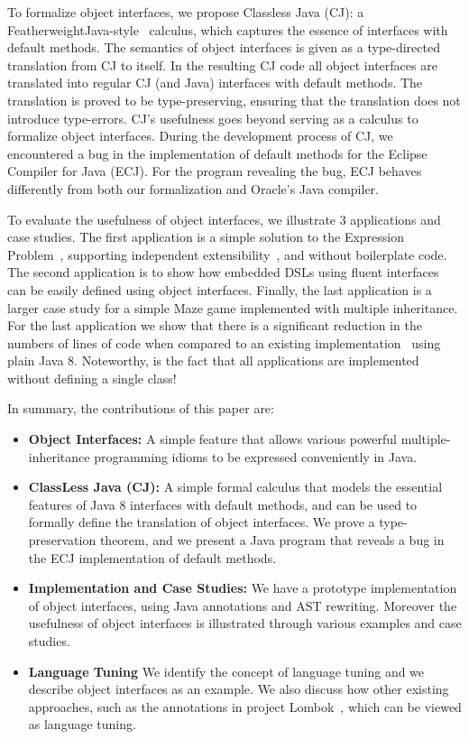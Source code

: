 To formalize object interfaces, we propose Classless Java (CJ): a
FeatherweightJava-style~\cite{Igarashi01FJ} calculus, which captures the essence
of interfaces with default methods. The semantics of object interfaces
is given as a type-directed translation from CJ to itself. In the
resulting CJ code all object interfaces are translated into regular CJ
(and Java) interfaces with default methods. The translation is proved
to be type-preserving, ensuring that the translation does not
introduce type-errors. CJ's usefulness goes beyond serving as a
calculus to formalize object interfaces. During the development
process of CJ, we encountered a bug in the implementation of default
methods for the Eclipse Compiler for Java (ECJ). For the program revealing the 
bug, ECJ behaves differently from both our formalization and Oracle's 
Java compiler.

To evaluate the usefulness of object interfaces, we illustrate 3
applications and case studies. The first application is a simple 
solution to the Expression Problem~\cite{wadler98expression}, supporting independent 
extensibility~\cite{zenger05independentlyextensible}, and without boilerplate code. The second
application is to show how embedded DSLs using fluent interfaces~\cite{fowler2005fluentinterface} 
can be easily defined using object interfaces. Finally, the last
application is a larger case study for a simple Maze game implemented with 
multiple inheritance. For the last application we show that there is a
significant reduction in the numbers of lines of code when compared 
to an existing implementation~\cite{bono14} using plain Java 8. 
Noteworthy, is the fact that all applications are implemented 
without defining a single class!

In summary, the contributions of this paper are:

\begin{itemize}

\item {\bf Object Interfaces:} A simple feature that allows various
  powerful multiple-inheritance programming idioms to be expressed
  conveniently in Java.

\item {\bf ClassLess Java (CJ):} A simple formal calculus that models 
the essential features of Java 8 interfaces with default methods, and 
can be used to formally define the translation of object interfaces. 
We prove a type-preservation theorem, and we present a Java program 
that reveals a bug in the ECJ implementation of default methods.

\item {\bf Implementation and Case Studies:} We have a prototype
  implementation of object interfaces, using Java
  annotations and AST rewriting. Moreover the usefulness of object interfaces is
  illustrated through various examples and case studies.

\item{\bf Language Tuning} We identify the concept of language tuning 
and we describe object interfaces as an example. We also discuss 
how other existing approaches, such as the annotations in project 
Lombok~\cite{lombok}, which can be viewed as language tuning.

\end{itemize}
